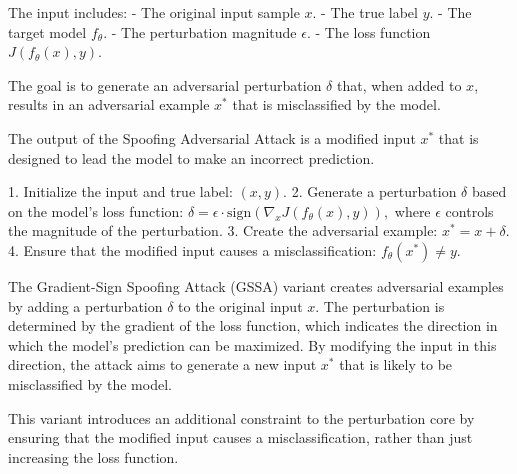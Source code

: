 The input includes:
- The original input sample \( x \).
- The true label \( y \).
- The target model \( f_{\theta} \).
- The perturbation magnitude \( \epsilon \).
- The loss function \( J(f_{\theta}(x), y) \).

The goal is to generate an adversarial perturbation \( \delta \) that, when added to \( x \), results in an adversarial example \( x^* \) that is misclassified by the model.


The output of the Spoofing Adversarial Attack is a modified input \( x^* \) that is designed to lead the model to make an incorrect prediction.

1. Initialize the input and true label:
   $
   (x, y).
   $
2. Generate a perturbation \( \delta \) based on the model's loss function:
   $
   \delta = \epsilon \cdot \text{sign}(\nabla_x J(f_{\theta}(x), y)),
   $
   where \( \epsilon \) controls the magnitude of the perturbation.
3. Create the adversarial example:
   $
   x^* = x + \delta.
   $
4. Ensure that the modified input causes a misclassification:
   $
   f_{\theta}(x^*) \neq y$.

The Gradient-Sign Spoofing Attack (GSSA) variant creates adversarial examples by adding a perturbation \( \delta \) to the original input \( x \). The perturbation is determined by the gradient of the loss function, which indicates the direction in which the model's prediction can be maximized. By modifying the input in this direction, the attack aims to generate a new input \( x^* \) that is likely to be misclassified by the model.

This variant introduces an additional constraint to the perturbation core by ensuring that the modified input causes a misclassification, rather than just increasing the loss function.